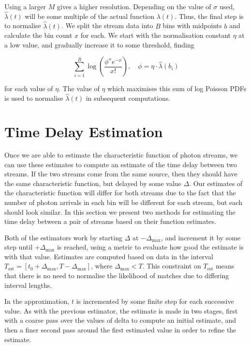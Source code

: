 \documentclass[a4paper,11pt]{article}
\begin{document}
   Using a larger $M$ gives a higher resolution. Depending on the value of
   $\sigma$ used, $\hat{\lambda}(t)$ will be some multiple of the actual
   function $\lambda(t)$. Thus, the final step is to normalise
   $\hat{\lambda}(t)$. We split the stream data into $B$ bins with midpoints $b$
   and calculate the bin count $x$ for each. We start with the normalisation
   constant $\eta$ at a low value, and gradually increase it to some threshold,
   finding

   \begin{equation}\label{eq:normcalc}
   \sum_{i=1}^B
   \log\left(\frac{\phi^xe^{-\phi}}{x!}\right), \quad \phi=\eta\cdot\hat{\lambda}(b_i)
   \end{equation}

   for each value of $\eta$. The value of $\eta$ which maximises this sum of log
   Poisson PDFs is used to normalise $\hat{\lambda}(t)$ in subsequent
   computations.
\section{Time Delay Estimation}
\label{sec-4}

  Once we are able to estimate the characteristic function of photon streams, we
  can use these estimates to compute an estimate of the time delay between two
  streams. If the two streams come from the same source, then they should have
  the same characteristic function, but delayed by some value $\Delta$. Our
  estimates of the characteristic function will differ for both streams due to
  the fact that the number of photon arrivals in each bin will be different for
  each stream, but each should look similar. In this section we present two
  methods for estimating the time delay between a pair of streams based on their
  function estimates.

  Both of the estimators work by starting $\Delta$ at $-\Delta_{\text{max}}$,
  and increment it by some step until $+\Delta_{\text{max}}$ is reached, using a
  metric to evaluate how good the estimate is with that value. Estimates are
  computed based on data in the interval
  $T_{\text{est}}=[t_0+\Delta_{\text{max}}, T-\Delta_{\text{max}}]$, where
  $\Delta_{\text{max}}<T$. This constraint on $T_{\text{est}}$ means that there
  is no need to normalise the likelihood of matches due to differing interval
  lengths.

  In the approximation, $t$ is incremented by some finite step for each
  successive value. As with the previous estimator, the estimate is made in two
  stages, first with a coarse pass over the values of delta to compute an
  initial estimate, and then a finer second pass around the first estimated
  value in order to refine the estimate.
\end{document}
